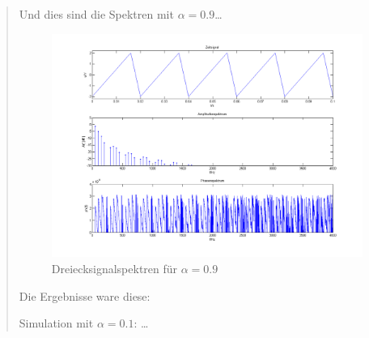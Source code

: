 \begin{quote}
\begin{center}
		\end{center}
		
		\vspace{1em}
		
		Und dies sind die Spektren mit $\alpha = 0.9$\ldots
		
		\begin{center}
	    
	           \begin{figure}[H]
    			\centering
    				\includegraphics[scale=0.5]{drei_alpha9.png}
    				\caption{Dreiecksignalspektren für $\alpha = 0.9$}
    			\end{figure}		
		
		\end{center}
		
		\vspace{1em}
		
		
		\vspace{1em}
		
 Die
		Ergebnisse ware diese:
		
		Simulation mit $\alpha = 0.1$: \ldots
	
		\begin{center}
	    

\end{center}
\end{quote}
